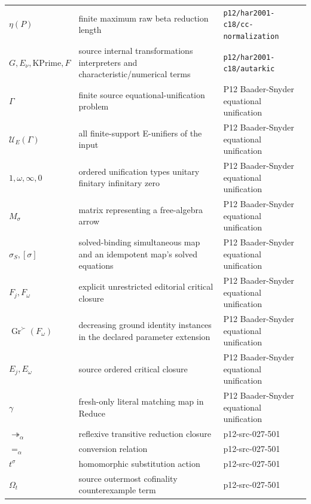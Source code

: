 \begin{longtable}{@{}p{}p{}p{}@{}}
\(\eta(P)\) & finite maximum raw beta reduction length & \texttt{p12/\allowbreak{}har2001-\allowbreak{}c18/\allowbreak{}cc-\allowbreak{}normalization} \\
\(G,\allowbreak E_\nu,\allowbreak \mathrm{KPrime},\allowbreak F\) & source internal transformations interpreters and characteristic/numerical terms & \texttt{p12/\allowbreak{}har2001-\allowbreak{}c18/\allowbreak{}autarkic} \\
\(\Gamma\) & finite source equational-unification problem & P12 Baader-\allowbreak{}Snyder equational unification \\
\(\mathcal U_E(\Gamma)\) & all finite-support E-unifiers of the input & P12 Baader-\allowbreak{}Snyder equational unification \\
\(1,\allowbreak \omega,\allowbreak \infty,\allowbreak 0\) & ordered unification types unitary finitary infinitary zero & P12 Baader-\allowbreak{}Snyder equational unification \\
\(M_\sigma\) & matrix representing a free-algebra arrow & P12 Baader-\allowbreak{}Snyder equational unification \\
\(\sigma_S,\allowbreak [\sigma]\) & solved-binding simultaneous map and an idempotent map's solved equations & P12 Baader-\allowbreak{}Snyder equational unification \\
\(F_j,\allowbreak F_\omega\) & explicit unrestricted editorial critical closure & P12 Baader-\allowbreak{}Snyder equational unification \\
\(\operatorname{Gr}^{\succ}(F_\omega)\) & decreasing ground identity instances in the declared parameter extension & P12 Baader-\allowbreak{}Snyder equational unification \\
\(E_j,\allowbreak E_\omega\) & source ordered critical closure & P12 Baader-\allowbreak{}Snyder equational unification \\
\(\gamma\) & fresh-only literal matching map in Reduce & P12 Baader-\allowbreak{}Snyder equational unification \\
\(\twoheadrightarrow_\alpha\) & reflexive transitive reduction closure & p12-\allowbreak{}src-\allowbreak{}027-\allowbreak{}501 \\
\(=_\alpha\) & conversion relation & p12-\allowbreak{}src-\allowbreak{}027-\allowbreak{}501 \\
\(t^\sigma\) & homomorphic substitution action & p12-\allowbreak{}src-\allowbreak{}027-\allowbreak{}501 \\
\(\Omega_t\) & source outermost cofinality counterexample term & p12-\allowbreak{}src-\allowbreak{}027-\allowbreak{}501 \\

\end{longtable}
